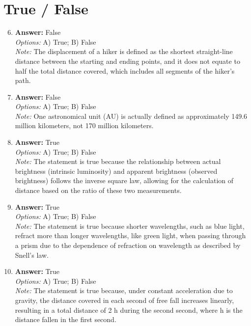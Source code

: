 \documentclass[12pt]{article}
\begin{document}
\section*{True / False}
\begin{enumerate}[label=\arabic*.]
\setcounter{enumi}{5}
\item \textbf{Answer:} False
\\ \textit{Options:} A) True; B) False
\\ \textit{Note:} The displacement of a hiker is defined as the shortest straight-line distance between the starting and ending points, and it does not equate to half the total distance covered, which includes all segments of the hiker's path.
\item \textbf{Answer:} False
\\ \textit{Options:} A) True; B) False
\\ \textit{Note:} One astronomical unit (AU) is actually defined as approximately 149.6 million kilometers, not 170 million kilometers.
\item \textbf{Answer:} True
\\ \textit{Options:} A) True; B) False
\\ \textit{Note:} The statement is true because the relationship between actual brightness (intrinsic luminosity) and apparent brightness (observed brightness) follows the inverse square law, allowing for the calculation of distance based on the ratio of these two measurements.
\item \textbf{Answer:} True
\\ \textit{Options:} A) True; B) False
\\ \textit{Note:} The statement is true because shorter wavelengths, such as blue light, refract more than longer wavelengths, like green light, when passing through a prism due to the dependence of refraction on wavelength as described by Snell's law.
\item \textbf{Answer:} True
\\ \textit{Options:} A) True; B) False
\\ \textit{Note:} The statement is true because, under constant acceleration due to gravity, the distance covered in each second of free fall increases linearly, resulting in a total distance of 2 h during the second second, where h is the distance fallen in the first second.
\end{enumerate}
\end{document}
